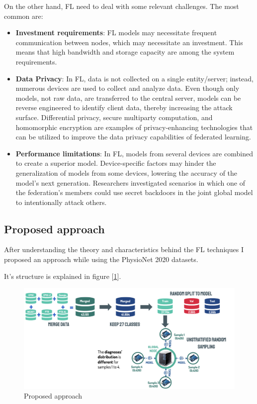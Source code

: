 On the other hand, FL need to deal with some relevant challenges. The most common are:

\begin{itemize}
    \item \textbf{Investment requirements}: FL models may necessitate frequent communication between nodes, which may necessitate an investment. This means that high bandwidth and storage capacity are among the system requirements.
    
    \item \textbf{Data Privacy}: In FL, data is not collected on a single entity/server; instead, numerous devices are used to collect and analyze data. Even though only models, not raw data, are transferred to the central server, models can be reverse engineered to identify client data, thereby increasing the attack surface. Differential privacy, secure multiparty computation, and homomorphic encryption are examples of privacy-enhancing technologies that can be utilized to improve the data privacy capabilities of federated learning.
    
    \item \textbf{Performance limitations}: In FL, models from several devices are combined to create a superior model. Device-specific factors may hinder the generalization of models from some devices, lowering the accuracy of the model's next generation. Researchers investigated scenarios in which one of the federation's members could use secret backdoors in the joint global model to intentionally attack others.
\end{itemize}

\subsection{Proposed approach} \label{proposed_approaches}

After understanding the theory and characteristics behind the FL techniques I proposed an approach while using the PhysioNet 2020 datasets.

It's structure is explained in figure [\ref{fig:fl_approach}].

\begin{figure}[H]
\centering
\includegraphics[scale=0.4]{img/fl_approach.png}
\caption{Proposed approach}
\label{fig:fl_approach}
\end{figure}

